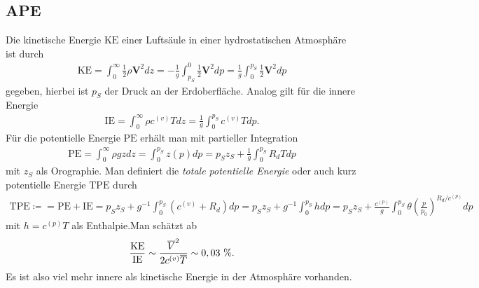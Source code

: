 \documentclass{book}
\newcommand\newoverline[1]{%
\overline{#1}}
\newcommand{\PE}{\text{PE}}
\newcommand{\KE}{\text{KE}}
\newcommand{\IE}{\text{IE}}
\newcommand{\TPE}{\text{TPE}}
\begin{document}
\subsection{APE}
\label{sec:ape}

Die kinetische Energie $\KE$ einer Luftsäule in einer hydrostatischen Atmosphäre ist durch
%
\begin{eqnarray}
\KE = \int_0^{\infty}\frac{1}{2}\rho\mathbf{V}^2dz = -\frac{1}{g}\int_{p_S}^0\frac{1}{2}\mathbf{V}^2dp = \frac{1}{g}\int_0^{p_S}\frac{1}{2}\mathbf{V}^2dp
\end{eqnarray}
%
gegeben, hierbei ist $p_S$ der Druck an der Erdoberfläche. Analog gilt für die innere Energie
%
\begin{eqnarray}
\IE = \int_0^\infty\rho c^{(v)}Tdz = \frac{1}{g}\int_{0}^{p_S}c^{(v)}Tdp.
\end{eqnarray}
%
Für die potentielle Energie $\PE$ erhält man mit partieller Integration
%
\begin{eqnarray}
\PE = \int_0^\infty\rho gzdz = \int_0^{p_S}z\left(p\right)dp = p_Sz_S + \frac{1}{g}\int_0^{p_S}R_dTdp
\end{eqnarray}
%
mit $z_S$ als Orographie. Man definiert die \textit{totale potentielle Energie} oder auch kurz potentielle Energie $\TPE$ durch
%
\begin{eqnarray}
\TPE \coloneqq = \PE + \IE = p_Sz_S + g^{-1}\int_0^{p_S}\left(c^{(v)} + R_d\right)dp = p_Sz_S + g^{-1}\int_0^{p_S}hdp = p_Sz_S + \frac{c^{(p)}}{g}\int_0^{p_S}\theta\left(\frac{p}{p_0}\right)^{R_d/c^{(p)}}dp\label{eq:tpe_id_1}
\end{eqnarray}
%
mit $h = c^{(p)}T$ als Enthalpie.Man schätzt ab
%
\begin{eqnarray}
\frac{\KE}{\IE} \sim \frac{\newoverline{V}^2}{2c^{(v)}\newoverline{T}} \sim 0, 03\text{ \%}.
\end{eqnarray}
%
Es ist also viel mehr innere als kinetische Energie in der Atmosphäre vorhanden.
\end{document}
